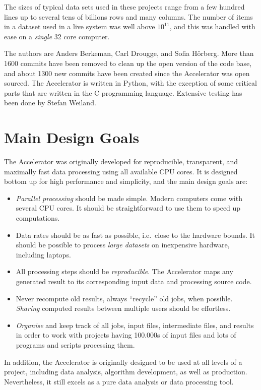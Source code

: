 The sizes of typical data sets used in these projects range from a few
hundred lines up to several tens of billions rows and many columns.
The number of items in a dataset used in a live system was well above
$10^{11}$, and this was handled with ease on a \emph{single} 32 core
computer.

The authors are Anders Berkeman, Carl Drougge, and Sofia H\"orberg.
More than 1600 commits have been removed to clean up the open version
of the code base, and about 1300 new commits have been created since
the Accelerator was open sourced.  The Accelerator is written in
Python, with the exception of some critical parts that are written in
the C programming language.  Extensive testing has been done by Stefan
Weiland.



\section{Main Design Goals}
The Accelerator was originally developed for reproducible,
transparent, and maximally fast data processing using all available
CPU cores.  It is designed bottom up for high performance and
simplicity, and the main design goals are:
\begin{itemize}

\item[] \textsl{Parallel processing} should be made simple.  Modern computers
  come with several CPU cores.  It should be straightforward to use
  them to speed up computations.
  
\item[] Data rates should be as fast as possible, i.e.\ close to the hardware
  bounds.  It should be possible to process \textsl{large datasets} on
  inexpensive hardware, including laptops.

\item[] All processing steps should be \textsl{reproducible}.
  The Accelerator maps any generated result to its corresponding input
  data and processing source code.

\item[] Never recompute old results, always ``recycle'' old jobs, when
  possible.  \textsl{Sharing} computed results between multiple users
  should be effortless.

\item[] \textsl{Organise} and keep track of all jobs, input files,
  intermediate files, and results in order to work with projects having
  100.000s of input files and lots of programs and scripts processing
  them.
  
\end{itemize}
In addition, the Accelerator is originally designed to be used at all
levels of a project, including data analysis, algorithm development,
as well as production.  Nevertheless, it still excels as a pure data
analysis or data processing tool.
